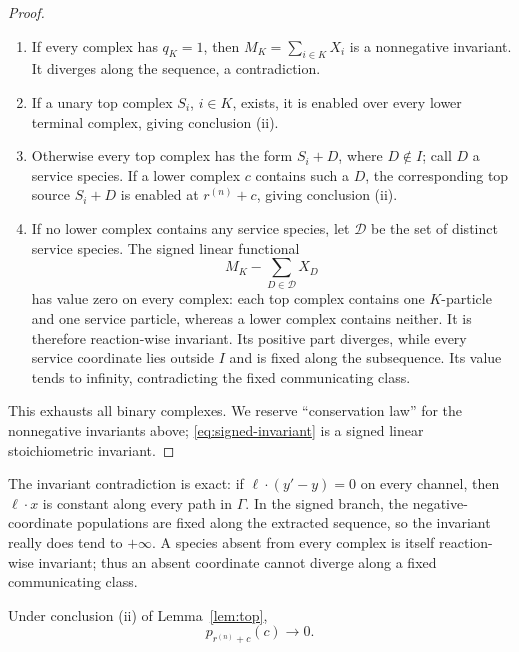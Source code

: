 \begin{proof}
\begin{enumerate}[label=\textup{3\alph*.},leftmargin=3em]
\item If every complex has \(q_K=1\), then
      \(M_K=\sum_{i\in K}X_i\) is a nonnegative invariant.  It diverges along
      the sequence, a contradiction.
\item If a unary top complex \(S_i\), \(i\in K\), exists, it is enabled over
      every lower terminal complex, giving conclusion (ii).
\item Otherwise every top complex has the form \(S_i+D\), where
      \(D\notin I\); call \(D\) a service species.  If a lower complex
      \(c\) contains such a \(D\), the corresponding top source \(S_i+D\)
      is enabled at \(r^{(n)}+c\), giving conclusion (ii).
\item If no lower complex contains any service species, let \(\mathcal D\)
      be the set of distinct service species.  The signed linear functional
      \begin{equation}\label{eq:signed-invariant}
        M_K-\sum_{D\in\mathcal D}X_D
      \end{equation}
      has value zero on every complex: each top complex contains one
      \(K\)-particle and one service particle, whereas a lower complex
      contains neither.  It is therefore reaction-wise invariant.  Its
      positive part diverges, while every service coordinate lies outside
      \(I\) and is fixed along the subsequence.  Its value tends to infinity,
      contradicting the fixed communicating class.
\end{enumerate}

This exhausts all binary complexes.  We reserve ``conservation law'' for the
nonnegative invariants above; \eqref{eq:signed-invariant} is a signed linear
stoichiometric invariant.
\end{proof}

The invariant contradiction is exact: if \(\ell\cdot(y'-y)=0\) on every
channel, then \(\ell\cdot x\) is constant along every path in \(\Gamma\).
In the signed branch, the negative-coordinate populations are fixed along
the extracted sequence, so the invariant really does tend to \(+\infty\).
A species absent from every complex is itself reaction-wise invariant; thus an
absent coordinate cannot diverge along a fixed communicating class.

\begin{lemma}\label{lem:terminal}
Under conclusion \textup{(ii)} of Lemma~\ref{lem:top},
\begin{equation}\label{eq:terminal-zero}
  p_{r^{(n)}+c}(c)\longrightarrow0.
\end{equation}
\end{lemma}

